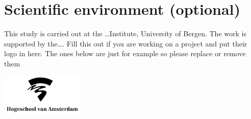 \chapter{Scientific environment (optional)}

This study is carried out at the \ldots Institute, University of Bergen. 
The work is supported by the\ldots. 
Fill this out if you are working on a project and put their logo in here. The ones below are just for example so please replace or remove them\\
\vspace*{\fill}
\begin{center}
\includegraphics[width=40mm]{figures/hva-logo-png-7.png}
\hspace{1cm}


\end{center}





